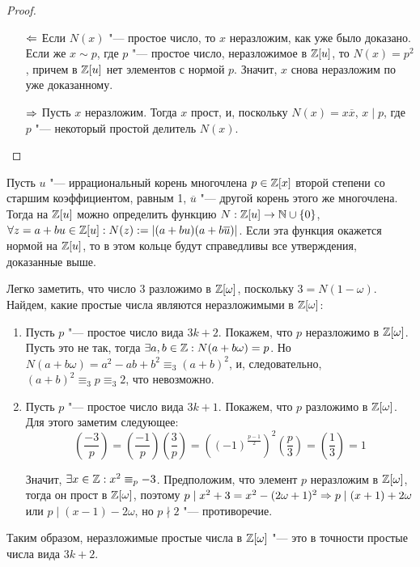 \begin{proof}~
	\begin{itemize}
		\item[$\Leftarrow$] Если $N(x)$ "--- простое число, то $x$ неразложим, как уже было доказано. Если же $x \sim p$, где $p$ "--- простое число, неразложимое в $\mathbb{Z}[u]$, то $N(x) = p^2$, причем в $\mathbb{Z}[u]$ нет элементов с нормой $p$. Значит, $x$ снова неразложим по уже доказанному.
		\item[$\Rightarrow$] Пусть $x$ неразложим. Тогда $x$ прост, и, поскольку $N(x) = x\overline{x}$, $x \mid p$, где $p$ "--- некоторый простой делитель $N(x)$.\qedhere
	\end{itemize}
\end{proof}

\begin{note}
	Пусть $u$ "--- иррациональный корень многочлена $p \in \mathbb{Z}[x]$ второй степени со старшим коэффициентом, равным 1, $\overline{u}$ "--- другой корень этого же многочлена. Тогда на $\mathbb{Z}[u]$ можно определить функцию $N: \mathbb{Z}[u] \to \mathbb{N} \cup \{0\}$, $\forall z = a + bu \in \mathbb{Z}[u]: N(z) := |(a + bu)(a + b\overline{u})|$. Если эта функция окажется нормой на $\mathbb{Z}[u]$, то в этом кольце будут справедливы все утверждения, доказанные выше.
\end{note}

\begin{example}
	Легко заметить, что число 3 разложимо в $\mathbb{Z}[\omega]$, поскольку $3 = N(1 - \omega)$. Найдем, какие простые числа являются неразложимыми в $\mathbb{Z}[\omega]$:
	\begin{enumerate}
		\item Пусть $p$ "--- простое число вида $3k + 2$. Покажем, что $p$ неразложимо в $\mathbb{Z}[\omega]$. Пусть это не так, тогда $\exists a, b \in \mathbb{Z}: N(a + b\omega) = p$. Но $N(a + b\omega) = a^2 - ab + b^2 \equiv_3 (a + b)^2$, и, следовательно, $(a + b)^2 \equiv_3 p \equiv_3 2$, что невозможно.
		\item Пусть $p$ "--- простое число вида $3k + 1$. Покажем, что $p$ разложимо в $\mathbb{Z}[\omega]$. Для этого заметим следующее:
		\[\left(\frac{-3}p\right) = \left(\frac{-1}p\right)\left(\frac{3}p\right) = \left((-1)^{\frac{p-1}2}\right)^2\left(\frac p3\right) = \left(\frac13\right) = 1\]
		
		Значит, $\exists x \in \mathbb{Z}: x^2 \equiv_p -3$. Предположим, что элемент $p$ неразложим в $\mathbb{Z}[\omega]$, тогда он прост в $\mathbb{Z}[\omega]$, поэтому $p \mid x^2 + 3 = x^2 - (2\omega+1)^2 \Rightarrow p \mid (x + 1) + 2\omega$ или $p \mid (x - 1) - 2\omega$, но $p \nmid 2$ "--- противоречие.
	\end{enumerate}
	
	Таким образом, неразложимые простые числа в $\mathbb{Z}[\omega]$ "--- это в точности простые числа вида $3k + 2$.
\end{example}